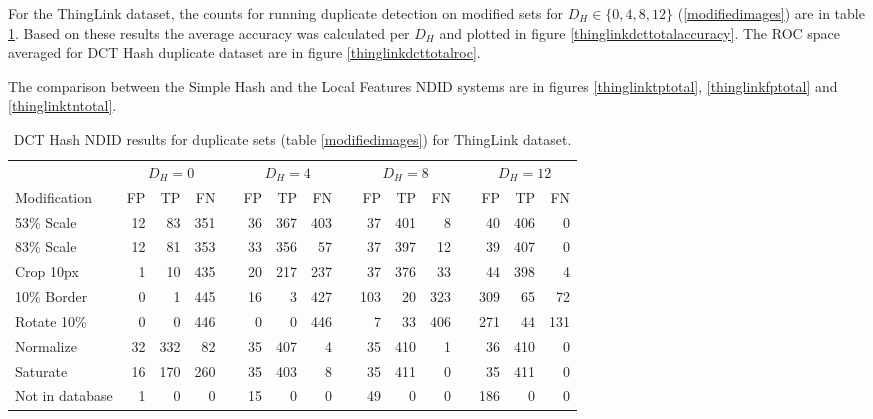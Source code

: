 \documentclass[english,12pt,a4paper,pdftex,elec,utf8]{aaltothesis}
\begin{document}
For the ThingLink dataset, the counts for running duplicate detection on modified sets for $D_H \in\{0,4,8,12\}$ (\ref{modifiedimages}) are in table \ref{thinglinkdctresults}. Based on these results the average accuracy was calculated per $D_H$ and plotted in figure \ref{thinglinkdcttotalaccuracy}. The ROC space averaged for DCT Hash duplicate dataset are in figure \ref{thinglinkdcttotalroc}.

The comparison between the Simple Hash and the Local Features NDID systems are in figures \ref{thinglinktptotal}, \ref{thinglinkfptotal} and \ref{thinglinktntotal}.

\begin{table}[htb]\footnotesize
\caption{ DCT Hash NDID results for duplicate sets (table \ref{modifiedimages}) for ThingLink dataset. }
\label{thinglinkdctresults}
\begin{center}
  \setlength\tabcolsep{3pt} %
  \begin{tabular}{@{}lrrrrrrrrrrrrrrr@{}}
    \toprule
    & \multicolumn{3}{c}{$D_H = 0$} &\phantom{abc} &\multicolumn{3}{c}{$D_H = 4$} &\phantom{abc} & \multicolumn{3}{c}{$D_H=8$} &\phantom{abc} & \multicolumn{3}{c}{$D_H=12$}\\
\cmidrule{2-4} \cmidrule{6-8} \cmidrule{10-12} \cmidrule{14-16}
    Modification & FP & TP & FN &\phantom{abc} & FP & TP & FN &\phantom{abc} & FP & TP & FN &\phantom{abc} & FP & TP & FN\\ \midrule
    53\% Scale   & 12 & 83 & 351 &\phantom{abc} & 36 & 367 & 403 &\phantom{abc} & 37 & 401 & 8 &\phantom{abc} & 40 & 406 & 0\\
    83\% Scale   & 12 & 81 & 353 &\phantom{abc} & 33 & 356 & 57 &\phantom{abc} & 37 & 397 & 12 &\phantom{abc} & 39 & 407 & 0\\
    Crop 10px    & 1 & 10 & 435 &\phantom{abc} & 20 & 217 & 237 &\phantom{abc} & 37 & 376 & 33 &\phantom{abc} & 44 & 398 & 4\\
    10\% Border  & 0 & 1 & 445 & \phantom{abc} & 16 & 3 & 427 &\phantom{abc} & 103 & 20 & 323&\phantom{abc} & 309 & 65 & 72\\
    Rotate 10\%  & 0 & 0 & 446 &\phantom{abc} & 0 & 0 & 446 &\phantom{abc} & 7 & 33 & 406 &\phantom{abc} & 271 & 44 & 131\\
    Normalize    & 32 & 332 & 82 &\phantom{abc} & 35 & 407 & 4 &\phantom{abc} & 35 & 410 & 1 &\phantom{abc} & 36 & 410 & 0\\
    Saturate     & 16 & 170 & 260 &\phantom{abc} & 35  & 403 & 8 &\phantom{abc} & 35 & 411 & 0 &\phantom{abc} & 35 & 411 & 0\\
   Not in database & 1 & 0 & 0 &\phantom{abc} & 15  & 0 & 0 &\phantom{abc} & 49 & 0 & 0 &\phantom{abc} & 186 & 0 & 0\\
    \bottomrule
\end{tabular}
\end{center}
\end{table}
\end{document}
